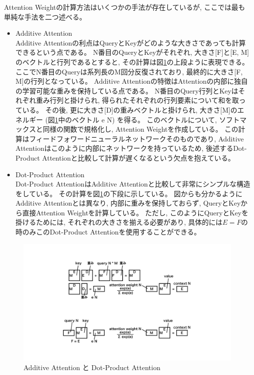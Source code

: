 Attention Weightの計算方法はいくつかの手法が存在しているが, ここでは最も単純な手法を二つ述べる。
\begin{itemize}
  \item Additive Attention\cite{BahdanauAttention}\\
  Additive Attentionの利点はQueryとKeyがどのような大きさであっても計算できるという点である。
  N番目のQueryとKeyがそれぞれ, 大きさ[F]と[E, M]のベクトルと行列であるとすると, その計算は図\ref{20Attention}の上段ように表現できる。
  ここでN番目のQueryは系列長のM回分反復されており, 最終的に大きさ[F, M]の行列となっている。
  Additive Attentionの特徴はAttentionの内部に独自の学習可能な重みを保持している点である。
  N番目のQuery行列とKeyはそれぞれ重み行列と掛けられ, 得られたそれぞれの行列要素について和を取っている。
  その後, 更に大きさ[D]の重みベクトルと掛けられ, 大きさ[M]のエネルギー (図\ref{20Attention}中のベクトル e N) を得る。
  このベクトルについて, ソフトマックスと同様の関数で規格化し, Attention Weightを作成している。
  この計算はフィードフォワードニューラルネットワークそのものであり, Additive Attentionはこのように内部にネットワークを持っているため, 後述するDot-Product Attentionと比較して計算が遅くなるという欠点を抱えている。

  \item Dot-Product Attention\cite{LuongAttention}\\
  Dot-Product AttentionはAdditive Attentionと比較して非常にシンプルな構造をしている。
  その計算を図\ref{20Attention}の下段に示している。
  図からも分かるようにAdditive Attentionとは異なり, 内部に重みを保持しておらず, QueryとKeyから直接Attention Weightを計算している。
  ただし, このようにQueryとKeyを掛けるためには, それぞれの大きさを揃える必要があり, 具体的には$E=F$の時のみこのDot-Product Attentionを使用することができる。
\end{itemize}
  
\begin{figure}[htbp]
 \centering
 \includegraphics[trim = 200 100 200 100, width=1.0\textwidth, clip]{Figure/2DeepLearning/20Attention.png}
 \caption{Additive Attention と Dot-Product Attention}
 \label{20Attention}
\end{figure}


